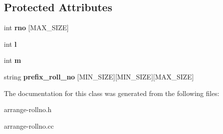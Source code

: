 \subsection*{Protected Attributes}
\begin{DoxyCompactItemize}
\item 
\hypertarget{classArrangeRollNo_acf5d0a49632ff54fcf9281ccfd9c8cd9}{int {\bfseries rno} \mbox{[}M\-A\-X\-\_\-\-S\-I\-Z\-E\mbox{]}}\label{classArrangeRollNo_acf5d0a49632ff54fcf9281ccfd9c8cd9}

\item 
\hypertarget{classArrangeRollNo_a1a1aee004c6072358474336b20fdae27}{int {\bfseries l}}\label{classArrangeRollNo_a1a1aee004c6072358474336b20fdae27}

\item 
\hypertarget{classArrangeRollNo_a626e7c9475affbe5b55d1aa4f69269c7}{int {\bfseries m}}\label{classArrangeRollNo_a626e7c9475affbe5b55d1aa4f69269c7}

\item 
\hypertarget{classArrangeRollNo_a45badfe828041d92fc5d7ad0a5b7ac07}{string {\bfseries prefix\-\_\-roll\-\_\-no} \mbox{[}M\-I\-N\-\_\-\-S\-I\-Z\-E\mbox{]}\mbox{[}M\-I\-N\-\_\-\-S\-I\-Z\-E\mbox{]}\mbox{[}M\-A\-X\-\_\-\-S\-I\-Z\-E\mbox{]}}\label{classArrangeRollNo_a45badfe828041d92fc5d7ad0a5b7ac07}

\end{DoxyCompactItemize}


The documentation for this class was generated from the following files\-:\begin{DoxyCompactItemize}
\item 
arrange-\/rollno.\-h\item 
arrange-\/rollno.\-cc\end{DoxyCompactItemize}
